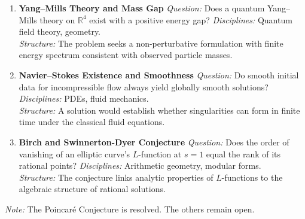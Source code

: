 {\begin{enumerate}
    \textit{Disciplines:} Number theory, complex analysis.\\
    \textit{Structure:} The location of these zeros governs error terms in prime-counting estimates and constrains fluctuations in arithmetic sequences.
    \vspace{1em}
    \item \textbf{Yang–Mills Theory and Mass Gap}  
    \textit{Question:} Does a quantum Yang–Mills theory on \( \mathbb{R}^4 \) exist with a positive energy gap?  
    \textit{Disciplines:} Quantum field theory, geometry.\\
    \textit{Structure:} The problem seeks a non-perturbative formulation with finite energy spectrum consistent with observed particle masses.
    \vspace{1em}
    \item \textbf{Navier–Stokes Existence and Smoothness}  
    \textit{Question:} Do smooth initial data for incompressible flow always yield globally smooth solutions?  
    \textit{Disciplines:} PDEs, fluid mechanics.\\
    \textit{Structure:} A solution would establish whether singularities can form in finite time under the classical fluid equations.
    \vspace{1em}
    \item \textbf{Birch and Swinnerton-Dyer Conjecture}  
    \textit{Question:} Does the order of vanishing of an elliptic curve’s \(L\)-function at \(s = 1\) equal the rank of its rational points?  
    \textit{Disciplines:} Arithmetic geometry, modular forms.\\
    \textit{Structure:} The conjecture links analytic properties of \(L\)-functions to the algebraic structure of rational solutions.
\end{enumerate}
    \vspace{1em}
\textit{Note:} The Poincaré Conjecture is resolved. The others remain open.
}
